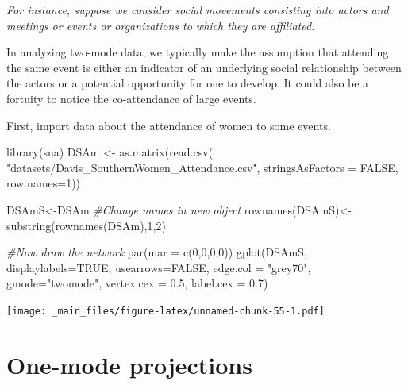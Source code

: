 \documentclass[
  notitlepage,
  onecolumn,
  openany]{book}
\newenvironment{Shaded}{\begin{snugshade}}{\end{snugshade}}
\newcommand{\AttributeTok}[1]{\textcolor[rgb]{0.77,0.63,0.00}{#1}}
\newcommand{\CommentTok}[1]{\textcolor[rgb]{0.56,0.35,0.01}{\textit{#1}}}
\newcommand{\ConstantTok}[1]{\textcolor[rgb]{0.00,0.00,0.00}{#1}}
\newcommand{\DecValTok}[1]{\textcolor[rgb]{0.00,0.00,0.81}{#1}}
\newcommand{\FloatTok}[1]{\textcolor[rgb]{0.00,0.00,0.81}{#1}}
\newcommand{\FunctionTok}[1]{\textcolor[rgb]{0.00,0.00,0.00}{#1}}
\newcommand{\NormalTok}[1]{#1}
\newcommand{\OtherTok}[1]{\textcolor[rgb]{0.56,0.35,0.01}{#1}}
\newcommand{\StringTok}[1]{\textcolor[rgb]{0.31,0.60,0.02}{#1}}
\begin{document}
\emph{For instance, suppose we consider social movements consisting into actors and meetings or events or organizations to which they are affiliated}.

In analyzing two-mode data, we typically make the assumption that attending the same event is either an indicator of an underlying social relationship between the actors or a potential opportunity for one to develop. It could also be a fortuity to notice the co-attendance of large events.

First, import data about the attendance of women to some events.

\begin{Shaded}
\begin{Highlighting}[]
\FunctionTok{library}\NormalTok{(sna)}
\NormalTok{DSAm }\OtherTok{\textless{}{-}} \FunctionTok{as.matrix}\NormalTok{(}\FunctionTok{read.csv}\NormalTok{(}
  \StringTok{"datasets/Davis\_SouthernWomen\_Attendance.csv"}\NormalTok{,}
  \AttributeTok{stringsAsFactors =} \ConstantTok{FALSE}\NormalTok{, }\AttributeTok{row.names=}\DecValTok{1}\NormalTok{))}

\NormalTok{DSAmS}\OtherTok{\textless{}{-}}\NormalTok{DSAm}
\CommentTok{\#Change names in new object}
\FunctionTok{rownames}\NormalTok{(DSAmS)}\OtherTok{\textless{}{-}}\FunctionTok{substring}\NormalTok{(}\FunctionTok{rownames}\NormalTok{(DSAm),}\DecValTok{1}\NormalTok{,}\DecValTok{2}\NormalTok{)}

\CommentTok{\#Now draw the network}
\FunctionTok{par}\NormalTok{(}\AttributeTok{mar =} \FunctionTok{c}\NormalTok{(}\DecValTok{0}\NormalTok{,}\DecValTok{0}\NormalTok{,}\DecValTok{0}\NormalTok{,}\DecValTok{0}\NormalTok{))}
\FunctionTok{gplot}\NormalTok{(DSAmS, }
      \AttributeTok{displaylabels=}\ConstantTok{TRUE}\NormalTok{, }
      \AttributeTok{usearrows=}\ConstantTok{FALSE}\NormalTok{, }
      \AttributeTok{edge.col =} \StringTok{"grey70"}\NormalTok{,}
      \AttributeTok{gmode=}\StringTok{"twomode"}\NormalTok{,}
      \AttributeTok{vertex.cex =} \FloatTok{0.5}\NormalTok{,}
      \AttributeTok{label.cex =} \FloatTok{0.7}\NormalTok{)}
\end{Highlighting}
\end{Shaded}

\texttt{[image: \_main\_files/figure-latex/unnamed-chunk-55-1.pdf]}

\hypertarget{one-mode-projections}{%
\section{One-mode projections}\label{one-mode-projections}}
\end{document}
